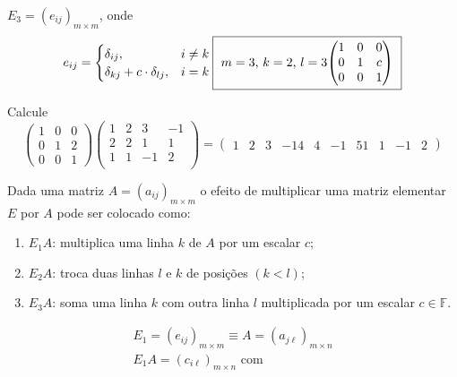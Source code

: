 \begin{definition}
\begin{enumerate}
          $E_{3}={\left(e_{ij}\right)}_{m\times m}$, onde
          \[
            e_{ij}=
            \begin{cases}
              \delta_{i j},                  & i\neq k \\
              \delta_{kj}+c\cdot\delta_{lj}, & i=k
            \end{cases}
            \fbox{
              $m=3$, $k=2$, $l=3$ \\
              \begin{math}
                \begin{pmatrix}
                  1 & 0 & 0 \\
                  0 & 1 & c \\
                  0 & 0 & 1
                \end{pmatrix}
              \end{math}
            }
          \]
  \end{enumerate}
\end{definition}

\begin{example}
  Calcule
  \[
    \begin{pmatrix}
      1 & 0 & 0 \\
      0 & 1 & 2 \\
      0 & 0 & 1
    \end{pmatrix}
    \begin{pmatrix}
      1 & 2 & 3  & -1 \\
      2 & 2 & 1  & 1  \\
      1 & 1 & -1 & 2  \\
    \end{pmatrix}=
    \begin{pmatrix}
      1 & 2 & 3  & -1
      4 & 4 & -1 & 5
      1 & 1 & -1 & 2
    \end{pmatrix}
  \]
\end{example}
Dada uma matriz $A={\left(a_{ij}\right)}_{m\times m}$ o efeito de multiplicar uma matriz elementar $E$ por $A$ pode ser colocado como:
\begin{enumerate}
  \item
  
  $E_{1}A$: multiplica uma linha $k$ de $A$ por um escalar $c$;

  \item

  $E_{2}A$: troca duas linhas $l$ e $k$ de posições
  $\left(k<l\right)$;

  \item

  $E_{3}A$: soma uma linha $k$ com outra linha $l$ multiplicada por um escalar $c\in\mathbb{F}$.
\end{enumerate}
\[
  \begin{array}{l}
    E_{1}=\left(e_{i j}\right)_{m \times m} \equiv A=\left(a_{j \ell}\right)_{m \times n} \\
    E_{1} A=\left(c_{i \ell}\right)_{m \times n} \text { com }
  \end{array}
\]